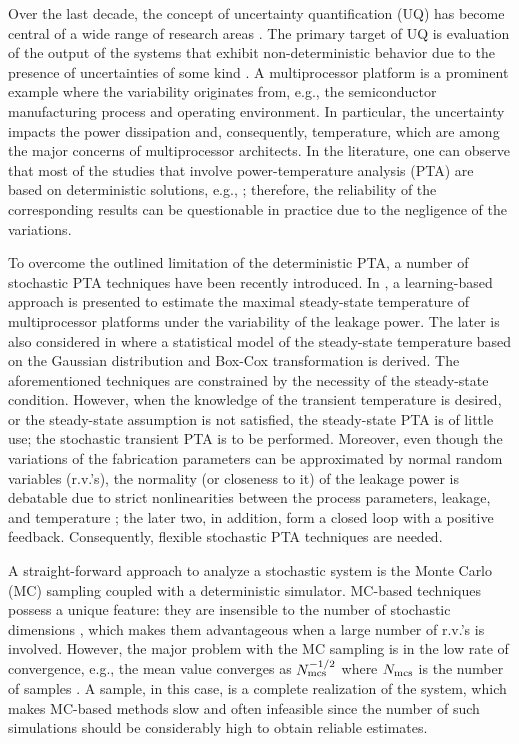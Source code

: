 Over the last decade, the concept of uncertainty quantification (UQ) has become central of a wide range of research areas \cite{xiu2009}. The primary target of UQ is evaluation of the output of the systems that exhibit non-deterministic behavior due to the presence of uncertainties of some kind \cite{eldred2009}. A multiprocessor platform is a prominent example where the variability originates from, e.g., the semiconductor manufacturing process and operating environment. In particular, the uncertainty impacts the power dissipation and, consequently, temperature, which are among the major concerns of multiprocessor architects. In the literature, one can observe that most of the studies that involve power-temperature analysis (PTA) are based on deterministic solutions, e.g., \cite{ukhov2012}; therefore, the reliability of the corresponding results can be questionable in practice due to the negligence of the variations.

To overcome the outlined limitation of the deterministic PTA, a number of stochastic PTA techniques have been recently introduced. In \cite{juan2011}, a learning-based approach is presented to estimate the maximal steady-state temperature of multiprocessor platforms under the variability of the leakage power. The later is also considered in \cite{juan2012} where a statistical model of the steady-state temperature based on the Gaussian distribution and Box-Cox transformation is derived. The aforementioned techniques are constrained by the necessity of the steady-state condition. However, when the knowledge of the transient temperature is desired, or the steady-state assumption is not satisfied, the steady-state PTA is of little use; the stochastic transient PTA is to be performed. Moreover, even though the variations of the fabrication parameters can be approximated by normal random variables (r.v.'s), the normality (or closeness to it) of the leakage power is debatable due to strict nonlinearities between the process parameters, leakage, and temperature \cite{liu2007}; the later two, in addition, form a closed loop with a positive feedback. Consequently, flexible stochastic PTA techniques are needed.

A straight-forward approach to analyze a stochastic system is the Monte Carlo (MC) sampling coupled with a deterministic simulator. MC-based techniques possess a unique feature: they are insensible to the number of stochastic dimensions \cite{maitre2010}, which makes them advantageous when a large number of r.v.'s is involved. However, the major problem with the MC sampling is in the low rate of convergence, e.g., the mean value converges as $N_\text{mcs}^{-{{1}/{2}}}$ where $N_\text{mcs}$ is the number of samples \cite{xiu2009, maitre2010}. A sample, in this case, is a complete realization of the system, which makes MC-based methods slow and often infeasible since the number of such simulations should be considerably high to obtain reliable estimates.

